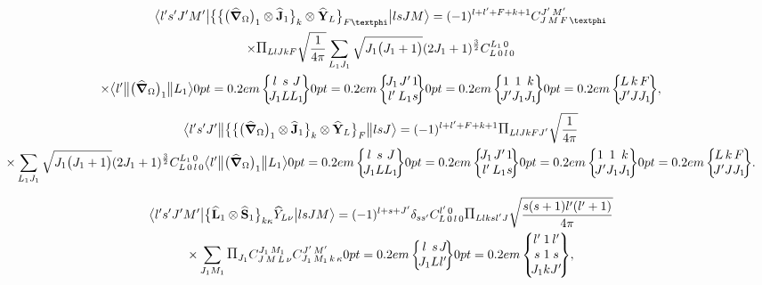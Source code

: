\begin{multline}
\braOket{ l^{\prime} s^{\prime} J^{\prime} M^{\prime}}{\bigl\{\bigl\{\bigl(\delop_{\Omega}\bigr)_{1} \otimes \widehat{\vect{J}}_{1}\bigr\}_{k} \otimes \widehat{\vect{Y}}_{L}\bigr\}_{F \varphi}}{l s J M}=(-1)^{l+l^{\prime}+F+k+1}
\clebsch{J}{M}{F}{\varphi}{J^{\prime}}{M^{\prime}} \\
\times \Fact{L l J k F}\sqrt{\frac{1}{4 \pi}} \sum_{L_{1} J_{1}} \sqrt{J_{1}\bigl(J_{1}+1\bigr)}(2 J_{1}+1)^{\frac{3}{2}} 
\clebsch{L}{0}{l}{0}{L_{1}}{0}  \\
\times
\braOketred{l^{\prime}}{\bigl(\delop_{\Omega}\bigr)_{1}}{ L_{1}}
\sixj{l}{s}{J}{J_{1}}{L}{L_{1}}
\sixj{J_{1}}{J^{\prime}}{1}{l^{\prime}}{L_{1}}{s}
\sixj{1}{1}{k}{J^{\prime}}{J_{1}}{J_{1}}
\sixj{L}{k}{F}{J^{\prime}}{J}{J_{1}},  \label{eq:13:2:141}
\end{multline}
\begin{multline*}
\braOketred{ l^{\prime} s^{\prime} J^{\prime}}{\bigl\{\bigl\{\bigl(\delop_{\Omega}\bigr)_{1} \otimes \widehat{\vect{J}}_{1}\bigr\}_{k} \otimes \widehat{\vect{Y}}_{L}\bigr\}_{F}}{l s J}=(-1)^{l+l^{\prime}+F+k+1}
\Fact{L l J k F J^{\prime}}\sqrt{\frac{1}{4 \pi}} \\
\times \sum_{L_{1} J_{1}} \sqrt{J_{1}\bigl(J_{1}+1\bigr)}(2 J_{1}+1)^{\frac{3}{2}}
\clebsch{L}{0}{l}{0}{L_{1}}{0}
\braOketred{l^{\prime}}{\bigl(\delop_{\Omega}\bigr)_{1}}{ L_{1}}
\sixj{l}{s}{J}{J_{1}}{L}{L_{1}}
\sixj{J_{1}}{J^{\prime}}{1}{l^{\prime}}{L_{1}}{s}
\sixj{1}{1}{k}{J^{\prime}}{J_{1}}{J_{1}}
\sixj{L}{k}{F}{J^{\prime}}{J}{J_{1}}.
\end{multline*}

\begin{multline}
\braOket{l^{\prime} s^{\prime} J^{\prime} M^{\prime}}{\bigl\{\widehat{\vect{L}}_{1} \otimes \widehat{\vect{S}}_{1}\bigr\}_{k \kappa} \widehat{Y}_{L \nu}}{ l s J M}=
(-1)^{l+s+J^{\prime}} \delta_{ss^{\prime}}
\clebsch{L}{0}{l}{0}{l^{\prime}}{0}
\Fact{L l k  s l^\prime J}
\sqrt{\frac{ s(s+1) l^{\prime}(l^{\prime}+1)}{4 \pi}} \\
\times \sum_{J_{1} M_{1}} \Fact{J_{1}}
\clebsch{J}{M}{L}{\nu}{J_{1}}{M_{1}} 
\clebsch{J_{1}}{M_{1}}{k}{\kappa}{J^{\prime}}{M^{\prime}}
\sixj{l}{s}{J}{J_{1}}{L}{l^{\prime}}
\ninej{l^{\prime}}{1}{l^{\prime}}{s}{1}{s}{J_{1}}{k}{J^{\prime}}, \label{eq:13:2:142}
\end{multline}


